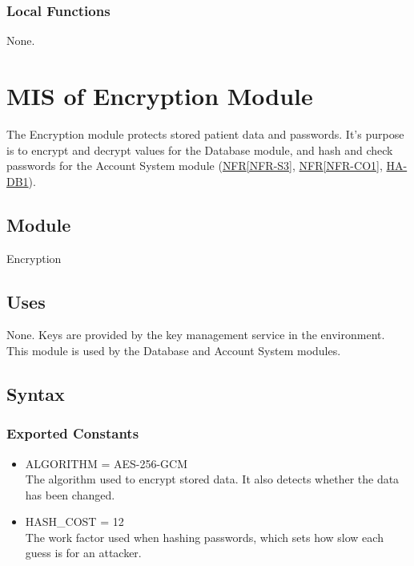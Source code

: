 \documentclass[12pt, titlepage]{article}
\newcommand{\srsref}[2]{\href{https://github.com/Nour-Fawaz/MacaBoca/blob/main/pdfs/SRS/SRS.pdf}{#1\ref*{#2}}}
\newcommand{\hazref}[1]{\href{https://github.com/Nour-Fawaz/MacaBoca/blob/main/pdfs/HazardAnalysis/HazardAnalysis.pdf}{#1}}
\begin{document}
\subsubsection{Local Functions}
None.

\newpage
\section{MIS of Encryption Module} \label{Encryption}
The Encryption module protects stored patient data and passwords. It's purpose is to encrypt and decrypt values for the Database module, and hash and check passwords for the Account System module (\srsref{NFR}{NFR-S3}, \srsref{NFR}{NFR-CO1}, \hazref{HA-DB1}).

\subsection{Module}
Encryption

\subsection{Uses}
None. Keys are provided by the key management service in the environment.\\
This module is used by the Database and Account System modules.

\subsection{Syntax}

\subsubsection{Exported Constants}
\begin{itemize}
\item ALGORITHM = AES-256-GCM\\
The algorithm used to encrypt stored data. It also detects whether the data has been changed.
\item HASH\_COST = 12\\
The work factor used when hashing passwords, which sets how slow each guess is for an attacker.
\end{itemize}
\end{document}
